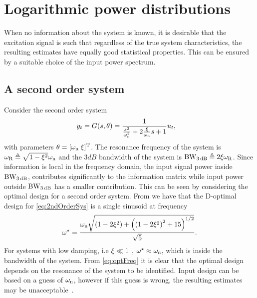 

\section{Logarithmic power distributions}\label{sec:logarithmic}
When no information about the system is known, it is desirable that
the excitation signal is such that regardless of the true system characteristics,
the resulting estimates have equally good statistical properties.
This can be ensured by a suitable choice of the input power spectrum.

 \subsection{A second order system}
Consider the second order system
\begin{align}
y_t &= G(s,\theta)=\frac{1}{\frac{s^2}{\omega_{\mathrm{n}}^2} + 2\frac{\xi}{\omega_{\mathrm{n}}}s + 1}u_t,
\label{eq:2ndOrderSys}
\end{align}
with parameters $\theta=[\omega_{\mathrm{n}}\;\xi]^{\mathrm{T}}$. The resonance frequency of the system is $\omega_{\mathrm{R}} \triangleq \sqrt{1-\xi^2}\omega_{\mathrm{n}}$
and the $3\unit{dB}$ bandwidth of the system is $\mathrm{BW}_{3\,\mathrm{dB}} \triangleq 2\xi\omega_{\mathrm{R}}$.
Since information is local in the frequency domain, the input signal power inside $\mathrm{BW}_{3\,\mathrm{dB}}$, contributes significantly to the information matrix while input power outside $\mathrm{BW}_{3\,\mathrm{dB}}$ has a smaller contribution. This can be seen by considering the optimal design for a second order system. From \citep{Goodwin1977} we have that the D-optimal design for \eqref{eq:2ndOrderSys} is a single sinusoid at frequency
\begin{align}
\omega^\star =\frac%
{\wn
  \sqrt{
    \left(1-2\damping^2\right)
    +
    \left(\left(1-2\damping^2\right)^2+15\right)^{1/2}
    }
  }
{\sqrt{5}}.
\label{eq:optFreq}
\end{align}
For systems with low damping, i.e $\xi\ll1$ , $\omega^\star\approx \omega_{\mathrm{n}}$, which is inside the bandwidth of the system. 
From \eqref{eq:optFreq} it is clear that the optimal design depends on the resonance of the system to be identified. 
Input design can be based on a guess of $\omega_{\mathrm{n}}$, however if this guess is wrong, the resulting estimates may be unacceptable~\citep{Rojas2007}.

